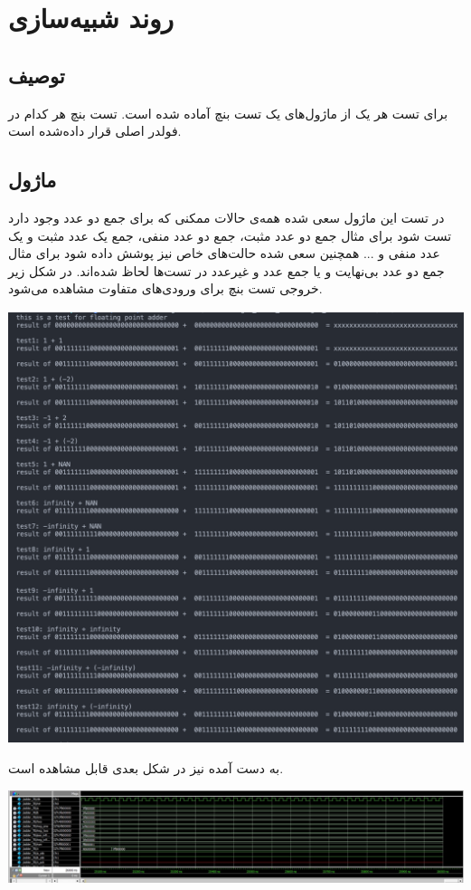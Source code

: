 \documentclass[12pt,titlepage,a4page , tikz , multi,table , svgnames,xcdraw]{article}
\begin{document}
\section{روند شبیه‌سازی}
\subsection{توصیف  }
برای تست هر یک از ماژول‌های 
یک تست بنچ آماده شده است. تست بنچ هر کدام در فولدر اصلی قرار داده‌شده است. 


\subsection{ ماژول }
در تست این ماژول سعی شده همه‌ی حالات ممکنی که برای جمع دو عدد وجود دارد تست شود برای مثال جمع دو عدد مثبت، جمع دو عدد منفی، جمع یک عدد مثبت و یک عدد منفی و ... همچنین سعی شده حالت‌های خاص نیز پوشش داده شود برای مثال جمع دو عدد بی‌نهایت و یا جمع عدد و غیرعدد در تست‌ها لحاظ شده‌اند.
در شکل زیر خروجی تست بنچ برای ورودی‌های متفاوت مشاهده می‌شود.
\begin{center}
\includegraphics[scale=0.2]
    {Images/Test Bench/adder_test_bench.png}
\end{center}
 به دست آمده نیز در شکل بعدی قابل مشاهده است.
\begin{center}
\includegraphics[scale=0.45]
    {Images/Test Bench/adder_waveform.jpg}
\end{center}
\end{document}
